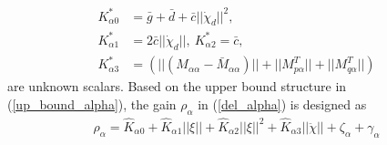 \documentclass[letterpaper, 10 pt, conference]{ieeeconf}  %
\begin{document}
\begin{align*}
 K_{\alpha0}^* &= \bar{g} + \bar{d} + \bar{c}||\dot{\chi}_d||^2,\\
K_{\alpha1}^* &= 2\bar{c}|| \dot{\chi}_d||,~
K_{\alpha2}^* = \bar{c}, \\
K_{\alpha3}^* &=  (||(M_{\alpha\alpha} - \bar{M}_{\alpha\alpha} )||+ ||M^T_{p\alpha}|| + ||M^T_{q\alpha}||)
\end{align*}
are unknown scalars. 
Based on the upper bound structure in (\ref{up_bound_alpha}), the gain $\rho_{\alpha}$ in (\ref{del_alpha}) is designed as
\begin{align}
\rho_{\alpha} = \hat{K}_{\alpha0} + \hat{K}_{\alpha1}||\xi|| + \hat{K}_{\alpha2}||\xi||^2 + \hat{K}_{\alpha3}||\ddot{\chi}|| + \zeta_{\alpha} + \gamma_{\alpha} \label{rho_alpha} 
\end{align}
\end{document}
